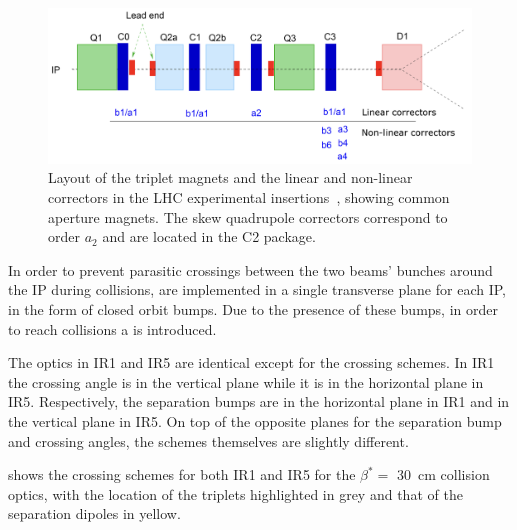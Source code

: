 \begin{figure}[!hbt]
  \centering
  \includegraphics*[width=\linewidth]{Figures/Optics_Measurements_Corrections_at_LHC/corrector_package.png}
  \caption{Layout of the triplet magnets and the linear and non-linear correctors in the LHC experimental insertions~\cite{CERN:Bruning:Dynap_Studies}, showing common aperture magnets. The skew quadrupole correctors correspond to order \(a_2\) and are located in the \textcolor{mplb}{C\num{2}} package.}
  \label{figure:lhc_ir_corrector_layout}
\end{figure}

In order to prevent parasitic crossings between the two beams' bunches around the IP during collisions,  are implemented in a single transverse plane for each IP, in the form of closed orbit bumps.
Due to the presence of these bumps, in order to reach collisions a  is introduced.

The optics in IR\num{1} and IR\num{5} are identical except for the crossing schemes.
In IR\num{1} the crossing angle is in the vertical plane while it is in the horizontal plane in IR\num{5}.
Respectively, the separation bumps are in the horizontal plane in IR\num{1} and in the vertical plane in IR\num{5}.
On top of the opposite planes for the separation bump and crossing angles, the schemes themselves are slightly different.

 shows the crossing schemes for both IR\num{1} and IR\num{5} for the \(\beta^{\ast} =\) \qty{30}{\centi\metre} collision optics, with the location of the triplets highlighted in grey and that of the separation dipoles in yellow.

